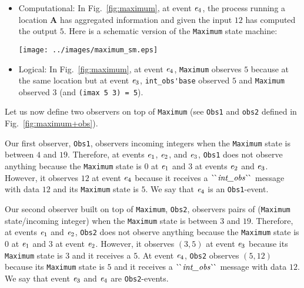 \documentclass[final]{article}
\begin{document}

\begin{itemize}
\item Computational: In Fig.~\ref{fig:maximum}, at event
  $\mathit{e}_4$, the process running a location \textbf{A} has
  aggregated information and given the input $12$ has computed the
  output $5$.
  Here is a schematic version of the \lstinline{Maximum} state machine:
  \begin{center}
    \texttt{[image: ../images/maximum\_sm.eps]}
  \end{center}

\item Logical: In Fig.~\ref{fig:maximum}, at event $\mathit{e}_4$,
  \lstinline{Maximum} observes $5$ because at the same location but at
  event $\mathit{e}_3$, \lstinline{int_obs'base} observed $5$ and
  \lstinline{Maximum} observed $3$ (and \lstinline{(imax 5 3) = 5}).
\end{itemize}


Let us now define two observers on top of \lstinline{Maximum} (see
\lstinline{Obs1} and \lstinline{obs2} defined in
Fig.~\ref{fig:maximum+obs}).

Our first observer, \lstinline{Obs1}, observers incoming integers when
the \lstinline{Maximum} state is between $4$ and $19$.  Therefore, at
events $\mathit{e}_1$, $\mathit{e}_2$, and $\mathit{e}_3$,
\lstinline{Obs1} does not observe anything because the
\lstinline{Maximum} state is $0$ at $\mathit{e}_1$ and $3$ at events
$\mathit{e}_2$ and $\mathit{e}_3$.  However, it observes $12$ at
event $\mathit{e}_4$ because it receives a $\CONSatoms{int\_obs}$
message with data $12$ and its \lstinline{Maximum} state is $5$.  We
say that $\mathit{e}_4$ is an \lstinline{Obs1}-event.

Our second observer built on top of \lstinline{Maximum},
\lstinline{Obs2}, observers pairs of (\lstinline{Maximum}
state/incoming integer) when the \lstinline{Maximum} state is between
$3$ and $19$.  Therefore, at events $\mathit{e}_1$ and
$\mathit{e}_2$, \lstinline{Obs2} does not observe anything because
the \lstinline{Maximum} state is $0$ at $\mathit{e}_1$ and $3$ at
event $\mathit{e}_2$.  However, it observes $(3,5)$ at event
$\mathit{e}_3$ because its \lstinline{Maximum} state is $3$ and it
receives a $5$.  At event $\mathit{e}_4$, \lstinline{Obs2} observes
$(5,12)$ because its \lstinline{Maximum} state is $5$ and it receives
a $\CONSatoms{int\_obs}$ message with data $12$.  We say that event
$\mathit{e}_3$ and $\mathit{e}_4$ are \lstinline{Obs2}-events.
\end{document}
